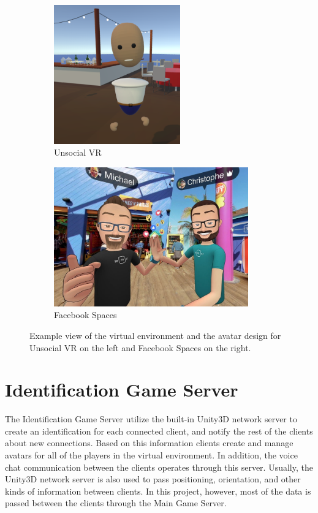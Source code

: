 \documentclass[]{simple-thesis}
\begin{document}
\begin{figure}
  \centering
  \begin{subfigure}{.4\textwidth}
    \centering
    \includegraphics[height=6cm]{../graphics/environment_demo.png}
    \caption{Unsocial VR}
    \label{fig:system:3d_design:unsocial_vr}
  \end{subfigure}%
  \begin{subfigure}{.6\textwidth}
    \centering
    \includegraphics[height=6cm]{../graphics/facebook_spaces.jpg}
    \caption{Facebook Spaces}
    \label{fig:system:3d_design:facebook_spaces}
  \end{subfigure}
  \caption{Example view of the virtual environment and the avatar design for Unsocial VR on the left and Facebook Spaces on the right.}
  \label{fig:system:3d_design}
\end{figure}

\section{Identification Game Server}

The Identification Game Server utilize the built-in Unity3D network server to create an identification for each connected client, and notify the rest of the clients about new connections.
Based on this information clients create and manage avatars for all of the players in the virtual environment.
In addition, the voice chat communication between the clients operates through this server.
Usually, the Unity3D network server is also used to pass positioning, orientation, and other kinds of information between clients.
In this project, however, most of the data is passed between the clients through the Main Game Server.
\end{document}
